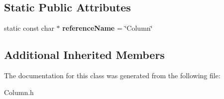 \subsection*{Static Public Attributes}
\begin{DoxyCompactItemize}
\item 
\hypertarget{class_arena_1_1_column_a9dea60358937d48f40ab12e427173717}{static const char $\ast$ {\bfseries reference\+Name} = \char`\"{}Column\char`\"{}}\label{class_arena_1_1_column_a9dea60358937d48f40ab12e427173717}

\end{DoxyCompactItemize}
\subsection*{Additional Inherited Members}


The documentation for this class was generated from the following file\+:\begin{DoxyCompactItemize}
\item 
Column.\+h\end{DoxyCompactItemize}
